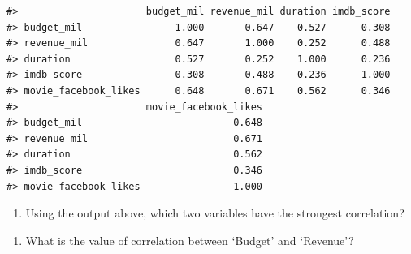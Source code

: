 \documentclass[
]{report}
\newenvironment{Shaded}{\begin{snugshade}}{\end{snugshade}}
\newcommand{\CommentTok}[1]{\textcolor[rgb]{0.56,0.35,0.01}{\textit{#1}}}
\newcommand{\DataTypeTok}[1]{\textcolor[rgb]{0.13,0.29,0.53}{#1}}
\newcommand{\DecValTok}[1]{\textcolor[rgb]{0.00,0.00,0.81}{#1}}
\newcommand{\KeywordTok}[1]{\textcolor[rgb]{0.13,0.29,0.53}{\textbf{#1}}}
\newcommand{\NormalTok}[1]{#1}
\newcommand{\OperatorTok}[1]{\textcolor[rgb]{0.81,0.36,0.00}{\textbf{#1}}}
\newcommand{\StringTok}[1]{\textcolor[rgb]{0.31,0.60,0.02}{#1}}
\providecommand{\tightlist}{%
  \setlength{\itemsep}{0pt}\setlength{\parskip}{0pt}}
\begin{document}
\begin{Shaded}
\end{Shaded}

\begin{verbatim}
#>                      budget_mil revenue_mil duration imdb_score
#> budget_mil                1.000       0.647    0.527      0.308
#> revenue_mil               0.647       1.000    0.252      0.488
#> duration                  0.527       0.252    1.000      0.236
#> imdb_score                0.308       0.488    0.236      1.000
#> movie_facebook_likes      0.648       0.671    0.562      0.346
#>                      movie_facebook_likes
#> budget_mil                          0.648
#> revenue_mil                         0.671
#> duration                            0.562
#> imdb_score                          0.346
#> movie_facebook_likes                1.000
\end{verbatim}

\begin{enumerate}
\def\labelenumi{\arabic{enumi}.}
\setcounter{enumi}{4}
\tightlist
\item
  Using the output above, which two variables have the strongest correlation?
\end{enumerate}

\vspace{0.5in}

\begin{enumerate}
\def\labelenumi{\arabic{enumi}.}
\setcounter{enumi}{5}
\tightlist
\item
  What is the value of correlation between `Budget' and `Revenue'?
\end{enumerate}

\vspace{0.3in}
\end{document}
